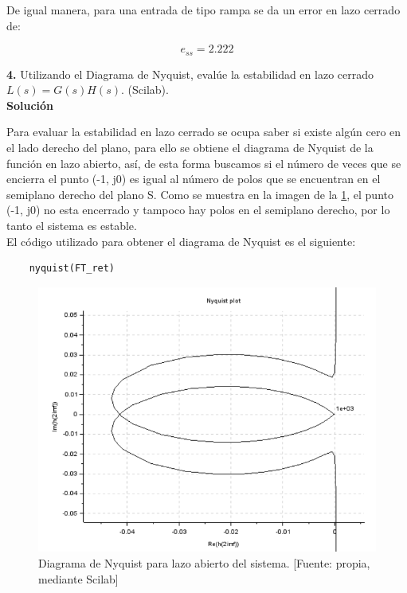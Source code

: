 \documentclass[12pt,letterpaper]{article}
\begin{document}
\bigskip

De igual manera, para una entrada de tipo rampa se da un error en lazo cerrado de:

\begin{equation}
    e_{ss} = 2.222
\end{equation}

\bigskip

\bigskip

\textbf{4.} Utilizando el Diagrama de Nyquist, evalúe la estabilidad en lazo cerrado $L(s) = G(s)H(s)$. (Scilab).\\

\textbf{Solución}

\bigskip

Para evaluar la estabilidad en lazo cerrado se ocupa saber si existe algún cero en el lado derecho del plano, para ello se obtiene el diagrama de Nyquist de la función en lazo abierto, así, de esta forma buscamos si el número de veces que se encierra el punto (-1, j0) es igual al número de polos que se encuentran en el semiplano derecho del plano S. Como se muestra en la imagen de la \ref{fig:fig4}, el punto (-1, j0) no esta encerrado y tampoco hay polos en el semiplano derecho, por lo tanto el sistema es estable. \\

El código utilizado para obtener el diagrama de Nyquist es el siguiente:  

\begin{verbatim}
    nyquist(FT_ret)    
\end{verbatim}

\begin{figure}[hbtp]
	\centering
	\includegraphics[width = .75 \columnwidth]{4nyquist_FT.png} 
	\caption[Figura3]{Diagrama de Nyquist para lazo abierto del sistema. [Fuente: propia, mediante Scilab]} 
	\label{fig:fig4} 
\end{figure}
\end{document}
